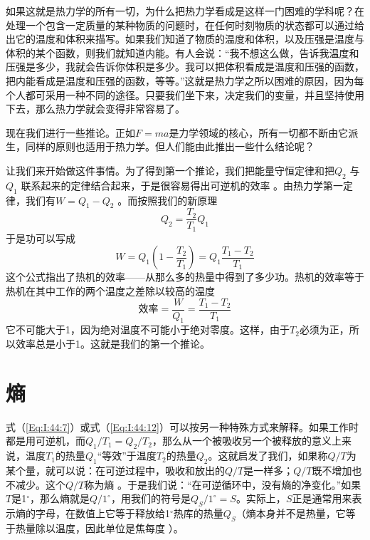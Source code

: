 如果这就是热力学的所有一切，为什么把热力学看成是这样一门困难的学科呢？在处理一个包含一定质量的某种物质的问题时，在任何时刻物质的状态都可以通过给出它的温度和体积来描写。如果我们知道了物质的温度和体积，以及压强是温度与体积的某个函数，则我们就知道内能。有人会说：“我不想这么做，告诉我温度和压强是多少，我就会告诉你体积是多少。我可以把体积看成是温度和压强的函数，把内能看成是温度和压强的函数，等等。”这就是热力学之所以困难的原因，因为每个人都可采用一种不同的途径。只要我们坐下来，决定我们的变量，并且坚持使用下去，那么热力学就会变得非常容易了。

现在我们进行一些推论。正如$F =ma$是力学领域的核心，所有一切都不断由它派生，同样的原则也适用于热力学。但人们能由此推出一些什么结论呢？

让我们来开始做这件事情。为了得到第一个推论，我们把能量守恒定律和把$Q_2$ 与$Q_1$ 联系起来的定律结合起来，于是很容易得出可逆机的效率 。由热力学第一定律，我们有$W =Q_1 -Q_2$ 。而按照我们的新原理
\begin{equation*}
    Q_2=\frac{T_2}{T_1}Q_1
\end{equation*}
于是功可以写成
\begin{equation}
    \label{Eq:I:44:13}
    W=Q_1\left(1-\frac{T_2}{T_1}\right) = Q_1\frac{T_1-T_2}{T_1}
\end{equation}
这个公式指出了热机的效率——从那么多的热量中得到了多少功。热机的效率等于热机在其中工作的两个温度之差除以较高的温度
\begin{equation}
    \label{Eq:I:44:14}
    \text{效率}=\frac{W}{Q_1}=\frac{T_1-T_2}{T_1}
\end{equation}
它不可能大于1，因为绝对温度不可能小于绝对零度。这样，由于$T_2$必须为正，所以效率总是小于1。这就是我们的第一个推论。

\section{熵}

式（\ref{Eq:I:44:7}）或式（\ref{Eq:I:44:12}）可以按另一种特殊方式来解释。如果工作时都是用可逆机，而$Q_1 /T_1 =Q_2 /T_2$，那么从一个被吸收另一个被释放的意义上来说，温度$T_1$的热量$Q_1$“等效”于温度$T_2$的热量$Q_2$。这就启发了我们，如果称$Q /T$为某个量，就可以说：在可逆过程中，吸收和放出的$Q /T$是一样多；$Q /T$既不增加也不减少。这个$Q /T$称为熵 。于是我们说：“在可逆循环中，没有熵的净变化。”如果$T $是1$^\circ$，那么熵就是$Q /1^\circ$，用我们的符号是$Q_S /1^\circ=S$。实际上，$S$正是通常用来表示熵的字母，在数值上它等于释放给1$^\circ$热库的热量$Q_S$（熵本身并不是热量，它等于热量除以温度，因此单位是焦每度 ）。

